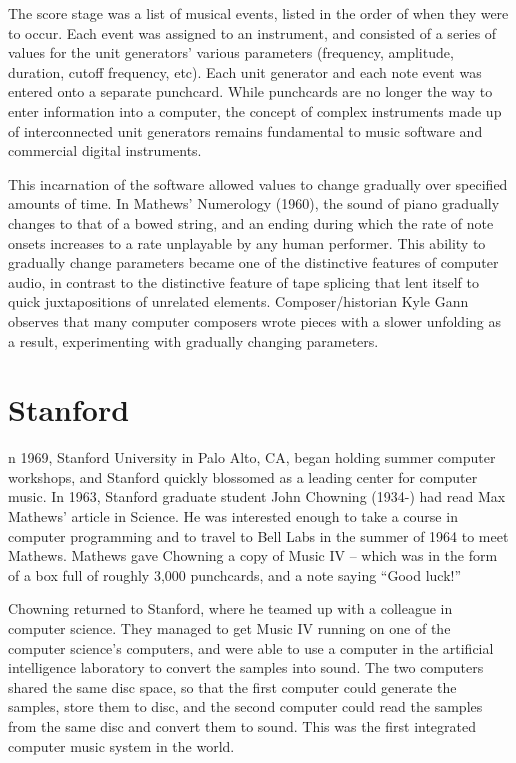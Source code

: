 The score stage was a list of musical events, listed in the order of when they were to occur. Each event was assigned to an instrument, and consisted of a series of values for the unit generators' various parameters (frequency, amplitude, duration, cutoff frequency, etc). Each unit generator and each note event was entered onto a separate punchcard. While punchcards are no longer the way to enter information into a computer, the concept of complex instruments made up of interconnected unit generators remains fundamental to music software and commercial digital instruments.

This incarnation of the software allowed values to change gradually over specified amounts of time. In Mathews' Numerology (1960), the sound of piano gradually changes to that of a bowed string, and an ending during which the rate of note onsets increases to a rate unplayable by any human performer. This ability to gradually change parameters became one of the distinctive features of computer audio, in contrast to the distinctive feature of tape splicing that lent itself to quick juxtapositions of unrelated elements. Composer/historian Kyle Gann observes that many computer composers wrote pieces with a slower unfolding as a result, experimenting with gradually changing parameters.

\section{Stanford}
n 1969, Stanford University in Palo Alto, CA, began holding summer computer workshops, and Stanford quickly blossomed as a leading center for computer music. In 1963, Stanford graduate student John Chowning (1934-) had read Max Mathews' article in Science. He was interested enough to take a course in computer programming and to travel to Bell Labs in the summer of 1964 to meet Mathews. Mathews gave Chowning a copy of Music IV -- which was in the form of a box full of roughly 3,000 punchcards, and a note saying ``Good luck!''

Chowning returned to Stanford, where he teamed up with a colleague in computer science. They managed to get Music IV running on one of the computer science's computers, and were able to use a computer in the artificial intelligence laboratory to convert the samples into sound. The two computers shared the same disc space, so that the first computer could generate the samples, store them to disc, and the second computer could read the samples from the same disc and convert them to sound. This was the first integrated computer music system in the world.

